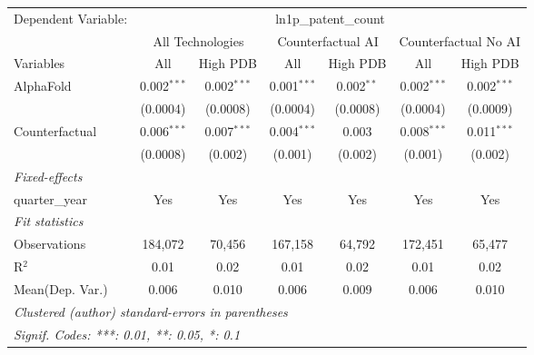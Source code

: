\begingroup
\centering
\begin{tabular}{lcccccc}
   \tabularnewline \midrule \midrule
   Dependent Variable: & \multicolumn{6}{c}{ln1p\_patent\_count}\\
 & \multicolumn{2}{c}{All Technologies} & \multicolumn{2}{c}{Counterfactual AI} & \multicolumn{2}{c}{Counterfactual No AI} \\
\cmidrule(lr){1-1}\cmidrule(lr){2-3} \cmidrule(lr){4-5} \cmidrule(lr){6-7}
Variables & \multicolumn{1}{c}{All} & \multicolumn{1}{c}{High PDB} & \multicolumn{1}{c}{All} & \multicolumn{1}{c}{High PDB} & \multicolumn{1}{c}{All} & \multicolumn{1}{c}{High PDB} \\
\cmidrule(lr){1-1}\cmidrule(lr){2-2} \cmidrule(lr){3-3} \cmidrule(lr){4-4} \cmidrule(lr){5-5} \cmidrule(lr){6-6} \cmidrule(lr){7-7}
   AlphaFold      & 0.002$^{***}$ & 0.002$^{***}$ & 0.001$^{***}$ & 0.002$^{**}$ & 0.002$^{***}$ & 0.002$^{***}$\\   
                  & (0.0004)      & (0.0008)      & (0.0004)      & (0.0008)     & (0.0004)      & (0.0009)\\   
   Counterfactual & 0.006$^{***}$ & 0.007$^{***}$ & 0.004$^{***}$ & 0.003        & 0.008$^{***}$ & 0.011$^{***}$\\   
                  & (0.0008)      & (0.002)       & (0.001)       & (0.002)      & (0.001)       & (0.002)\\   
   \midrule
   \emph{Fixed-effects}\\
   quarter\_year  & Yes           & Yes           & Yes           & Yes          & Yes           & Yes\\  
   \midrule
   \emph{Fit statistics}\\
   Observations   & 184,072       & 70,456        & 167,158       & 64,792       & 172,451       & 65,477\\  
   R$^2$          & 0.01          & 0.02          & 0.01          & 0.02         & 0.01          & 0.02\\  
Mean(Dep. Var.) & 0.006 & 0.010 & 0.006 & 0.009 & 0.006 & 0.010 \\
   \midrule \midrule
   \multicolumn{7}{l}{\emph{Clustered (author) standard-errors in parentheses}}\\
   \multicolumn{7}{l}{\emph{Signif. Codes: ***: 0.01, **: 0.05, *: 0.1}}\\
\end{tabular}
\par\endgroup
